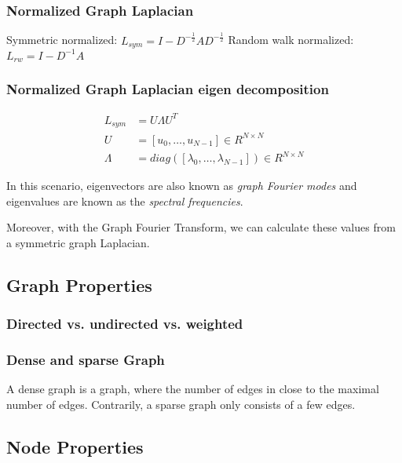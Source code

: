 \subsubsection{Normalized Graph Laplacian}

Symmetric normalized: $L_{sym} = I - D^{-\frac{1}{2}} A D^{-\frac{1}{2}}$
Random walk normalized: $L_{rw} = I - D^{-1} A$

\subsubsection{Normalized Graph Laplacian eigen decomposition}

\begin{equation}
    \begin{aligned}
        L_{sym} &= U \Lambda U^T \\
        U &= [u_0, \dots, u_{N-1}] \in R^{N \times N}\\
        \Lambda &= diag \left ( [\lambda_0, \dots, \lambda_{N-1}]  \right ) \in R^{N \times N}
    \end{aligned}
\end{equation}

In this scenario, eigenvectors are also known as \textit{graph Fourier modes}
and eigenvalues are known as the \textit{spectral frequencies}.

Moreover, with the Graph Fourier Transform, we can calculate these values from a symmetric
graph Laplacian.

\subsection{Graph Properties}

\subsubsection{Directed vs. undirected vs. weighted}

\subsubsection{Dense and sparse Graph}
A dense graph is a graph, where the number of edges in close to the maximal number of edges.
Contrarily, a sparse graph only consists of a few edges.

\subsection{Node Properties}
